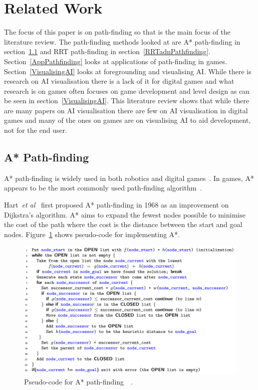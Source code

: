 \documentclass[journal]{IEEEtran}
\begin{document}
	\section{Related Work} \label{RelatedWork}
	The focus of this paper is on path-finding so that is the main focus of the literature review. The path-finding methods looked at are A* path-finding in section~\ref{A*PF} and RRT path-finding in section~\ref{RRTadnPathfinding}. Section~\ref{AppPathfinding} looks at applications of path-finding in games. Section~\ref{VisualisingAI} looks at foregrounding and visualising AI. While there is research on AI visualisation there is a lack of it for digital games and what research is on games often focuses on game development and level design as can be seen in section~\ref{VisualisingAI}. 
	This literature review shows that while there are many papers on AI visualisation there are few on AI visualisation in digital games and many of the ones on games are on visualising AI to aid development, not for the end user.     
	
	\subsection{A* Path-finding} \label{A*PF}
	A* path-finding is widely used in both robotics and digital games~\cite{Algfoor2015}. In games, A* appears to be the most commonly used path-finding algorithm~\cite{Algfoor2015}.
	
	Hart~\textit{et al}~\cite{Hart1968} first proposed A* path-finding in 1968 as an improvement on Dijkstra's algorithm. A* aims to expand the fewest nodes possible to minimise the cost of the path where the cost is the distance between the start and goal nodes. Figure~\ref{A*Pseudo} shows pseudo-code for implementing A*. 
	
	\begin{figure}[h]
		\includegraphics[width=1.0\linewidth]{APseudocode.png}
		\caption{Pseudo-code for A* path-finding~\cite{Hart1968}~\cite{pseudocode:A*}.}
		\label{A*Pseudo}
	\end{figure} 
	
\end{document}
